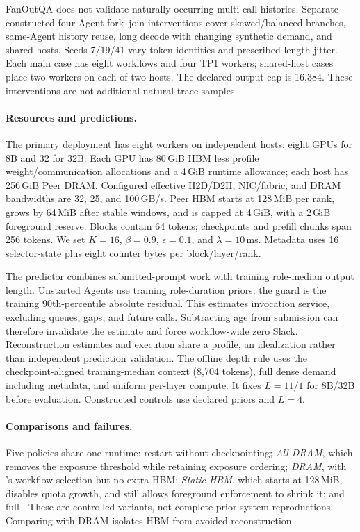 FanOutQA does not validate naturally occurring multi-call histories. Separate
constructed four-Agent fork--join interventions cover skewed/balanced branches,
same-Agent history reuse, long decode with changing synthetic demand, and
shared hosts. Seeds 7/19/41 vary token identities and prescribed length jitter.
Each main case has eight workflows and four TP1 workers; shared-host cases
place two workers on each of two hosts. The declared output cap is 16,384.
These interventions are not additional natural-trace samples.

\paragraph{Resources and predictions.}
The primary deployment has eight workers on independent hosts: eight GPUs for
8B and 32 for 32B. Each GPU has 80\,GiB HBM less profile weight/communication
allocations and a 4\,GiB runtime allowance; each host has 256\,GiB Peer DRAM.
Configured effective H2D/D2H, NIC/fabric, and DRAM bandwidths are 32, 25, and
100\,GB/s. Peer HBM starts at 128\,MiB per rank, grows by 64\,MiB after stable
windows, and is capped at 4\,GiB, with a 2\,GiB foreground reserve.
Blocks contain 64 tokens; checkpoints and prefill chunks span 256 tokens.
We set $K=16$, $\beta=0.9$, $\epsilon=0.1$, and $\lambda=10$\,ms.
Metadata uses 16 selector-state plus eight counter bytes per block/layer/rank.

The predictor combines submitted-prompt work with training role-median output
length. Unstarted Agents use training role-duration priors; the guard is the
training 90th-percentile absolute residual. This estimates invocation service,
excluding queues, gaps, and future calls. Subtracting age from submission can
therefore invalidate the estimate and force workflow-wide zero Slack.
Reconstruction estimates and execution share a profile, an idealization rather
than independent prediction validation. The offline depth rule uses the
checkpoint-aligned training-median context (8,704 tokens), full dense demand
including metadata, and uniform per-layer compute. It fixes $L=11/1$ for
8B/32B before evaluation. Constructed controls use declared priors and $L=4$.

\paragraph{Comparisons and failures.}
Five policies share one runtime: restart without checkpointing; \emph{All-DRAM},
which removes the exposure threshold while retaining exposure ordering;
\emph{DRAM}, with \system's workflow selection but no extra HBM;
\emph{Static-HBM}, which starts at 128\,MiB, disables quota growth, and still
allows foreground enforcement to shrink it; and full \system. These are
controlled variants, not complete prior-system reproductions. Comparing with
DRAM isolates HBM from avoided reconstruction.

